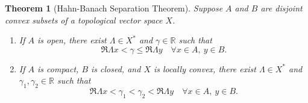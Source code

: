 \documentclass[12pt]{article}
\theoremstyle{thmstyle}
\newtheorem{theorem}{Theorem}[section]
\theoremstyle{defstyle}
\newcommand{\R}{\mathbb{R}}
\renewcommand{\le}{\leqslant}
\begin{document}
\begin{theorem}[Hahn-Banach Separation Theorem]
    Suppose $A$ and $B$ are disjoint convex subsets of a topological vector space $X$. 
    \begin{enumerate}[label=(\alph*)]
        \item If $A$ is open, there exist $\Lambda\in X^\ast$ and $\gamma\in\R$ such that 
        \begin{equation*}
            \Re\Lambda x < \gamma\le\Re\Lambda y\quad\forall x\in A,~y\in B.
        \end{equation*}
        \item If $A$ is compact, $B$ is closed, and $X$ is locally convex, there exist $\Lambda\in X^\ast$ and $\gamma_1,\gamma_2\in\R$ such that 
        \begin{equation*}
            \Re\Lambda x < \gamma_1 < \gamma_2 < \Re\Lambda y\quad\forall x\in A,~y\in B.
        \end{equation*}
    \end{enumerate}
\end{theorem}
\end{document}
